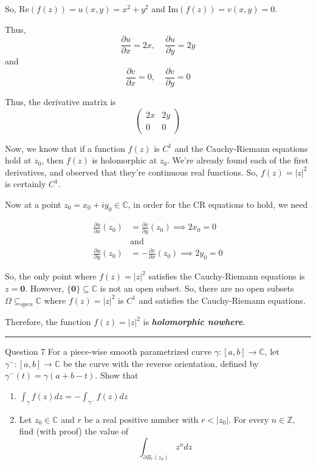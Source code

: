 \documentclass{article}
\newcommand{\C}{\mathbb{C}}
\begin{document}
\vskip 0.5cm
So, $\text{Re}(f(z)) = u(x, y) = x^2 + y^2$ and $\text{Im}(f(z)) = v(x, y) = 0$.

\vskip 0.5cm
Thus, 
\[ \frac{\partial u}{\partial x} = 2x, \;\;\;\; \frac{\partial u}{\partial y} = 2y \]
and 
\[ \frac{\partial v}{\partial x} = 0, \;\;\;\; \frac{\partial v}{\partial y} = 0 \]

\vskip 0.5cm
Thus, the derivative matrix is 
\[  \begin{pmatrix}
  2x & 2y \\
  0 & 0
\end{pmatrix}  \]

\vskip 0.5cm
Now, we know that if a function $f(z)$ is $C^1$ and the Cauchy-Riemann equations hold at $z_0$, then $f(z)$ is holomorphic at $z_0$. We're already found each of the first derivatives, and observed that they're continuous real functions. So, $f(z) = |z|^2$ is certainly $C^1$.

\vskip 0.25cm
Now at a point $z_0 = x_0 +i y_0 \in \C$, in order for the CR equations to hold, we need 

\begin{align*}
  \frac{\partial u}{\partial x}(z_0) &= \frac{\partial v}{\partial y}(z_0) \implies 2x_0 = 0 \\
  &\text{and}  \\
  \frac{\partial u}{\partial y}(z_0) &= -\frac{\partial v}{\partial x}(z_0)  \implies 2y_0 = 0
\end{align*}

So, the only point where $f(z) = |z|^2$ satisfies the Cauchy-Riemann equations is $z = \mathbf{0}$. However, $\{\mathbf{0}\} \subseteq \C$ is not an open subset. So, there are no open subsets $\Omega \subseteq_{open} \C$ where $f(z) = |z|^2$ is $C^1$ and satisfies the Cauchy-Riemann equations. 

\vskip 0.5cm
Therefore, the function $f(z) = |z|^2$ is \emph{\textbf{holomorphic nowhere}}.


\vskip 0.5cm
\hrule 
\vskip 0.5cm

\begin{mathdefinitionbox}{Question 7}
\vskip 0.5cm
For a piece-wise smooth parametrized curve $\gamma : [a, b] \rightarrow \C$, let $\gamma^{-} : [a, b] \rightarrow \C$ be the curve with the reverse orientation, defined by $\gamma^{-}(t) = \gamma(a + b - t)$. Show that 
\begin{enumerate}[label=(\alph*)]
  \item $\int_{\gamma} f(z) dz =  - \int_{\gamma^{-}} f(z) dz$
  \item Let $z_0 \in \C$ and $r$ be a real positive number with $r < |z_0|$. For every $n \in \mathbb{Z}$, find (with proof) the value of 
  \[ \int_{\partial B_{r}(z_0)} z^n dz \]
\end{enumerate} 
\end{mathdefinitionbox}
\end{document}
